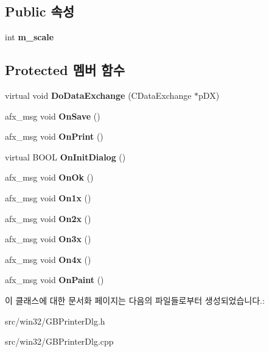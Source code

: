 \subsection*{Public 속성}
\begin{DoxyCompactItemize}
\item 
\mbox{\label{class_g_b_printer_dlg_a0d0e4757bd074a2ab18268b938f76f85}} 
int {\bfseries m\+\_\+scale}
\end{DoxyCompactItemize}
\subsection*{Protected 멤버 함수}
\begin{DoxyCompactItemize}
\item 
\mbox{\label{class_g_b_printer_dlg_a686ce094a0100066f2a6446c908af150}} 
virtual void {\bfseries Do\+Data\+Exchange} (C\+Data\+Exchange $\ast$p\+DX)
\item 
\mbox{\label{class_g_b_printer_dlg_a3cfa1c22a60df868b53c9e9d52094963}} 
afx\+\_\+msg void {\bfseries On\+Save} ()
\item 
\mbox{\label{class_g_b_printer_dlg_ac778254287374af1e218e778bdde4f26}} 
afx\+\_\+msg void {\bfseries On\+Print} ()
\item 
\mbox{\label{class_g_b_printer_dlg_a0e1d0d5e238e3133e088bd1be4711755}} 
virtual B\+O\+OL {\bfseries On\+Init\+Dialog} ()
\item 
\mbox{\label{class_g_b_printer_dlg_aa66f44a9ecd963327cf019c25ad3c54d}} 
afx\+\_\+msg void {\bfseries On\+Ok} ()
\item 
\mbox{\label{class_g_b_printer_dlg_a56ab3fb0b4285c737a7ea796771a01a4}} 
afx\+\_\+msg void {\bfseries On1x} ()
\item 
\mbox{\label{class_g_b_printer_dlg_a9b887ad630794874e2b39c3558bf5d33}} 
afx\+\_\+msg void {\bfseries On2x} ()
\item 
\mbox{\label{class_g_b_printer_dlg_ac3863f81d31a5d37a0369dab6bfbf87e}} 
afx\+\_\+msg void {\bfseries On3x} ()
\item 
\mbox{\label{class_g_b_printer_dlg_a36d0db8d85c1c2b70c3b9aa8b35c0026}} 
afx\+\_\+msg void {\bfseries On4x} ()
\item 
\mbox{\label{class_g_b_printer_dlg_a07a9791b8dc7695afcaa02abada894db}} 
afx\+\_\+msg void {\bfseries On\+Paint} ()
\end{DoxyCompactItemize}


이 클래스에 대한 문서화 페이지는 다음의 파일들로부터 생성되었습니다.\+:\begin{DoxyCompactItemize}
\item 
src/win32/G\+B\+Printer\+Dlg.\+h\item 
src/win32/G\+B\+Printer\+Dlg.\+cpp\end{DoxyCompactItemize}
